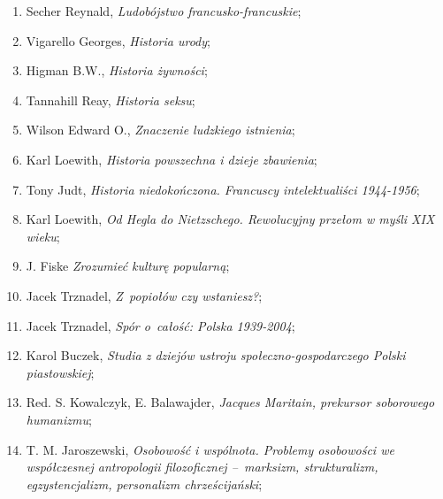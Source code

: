 \documentclass[a4paper,11pt]{article}
\begin{document}
\begin{enumerate}
\item Secher Reynald, \textit{Ludobójstwo francusko-francuskie};



\item Vigarello Georges, \textit{Historia urody};



\item Higman B.W., \textit{Historia żywności};



\item Tannahill Reay, \textit{Historia seksu};



\item Wilson Edward O., \textit{Znaczenie ludzkiego istnienia};



\item Karl Loewith, \textit{Historia powszechna i dzieje zbawienia};



\item Tony Judt, \textit{Historia niedokończona. Francuscy
    intelektualiści 1944-1956};



\item Karl Loewith, \textit{Od Hegla do Nietzschego. Rewolucyjny przełom
    w myśli XIX wieku};



\item J. Fiske \textit{Zrozumieć kulturę popularną};



\item Jacek Trznadel, \textit{Z~popiołów czy wstaniesz?};



\item Jacek Trznadel, \textit{Spór o~całość: Polska 1939-2004};



\item Karol Buczek, \textit{Studia z dziejów ustroju
    społeczno-gospodarczego Polski piastowskiej};



\item Red. S. Kowalczyk, E. Balawajder, \textit{Jacques Maritain,
    prekursor soborowego humanizmu};



\item T. M. Jaroszewski, \textit{Osobowość i wspólnota. Problemy
    osobowości we współczesnej antropologii filozoficznej --~marksizm,
    strukturalizm, egzystencjalizm, personalizm chrześcijański};




\end{enumerate}
\end{document}

